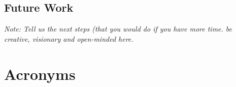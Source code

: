 \documentclass[a4paper,12pt,twoside]{report}
\begin{document}
\section{Future Work}

\textit{Note: Tell us the next steps  (that you would do if you have more time. be creative, visionary and open-minded here.}



\appendix

\chapter{Acronyms}

\begin{acronym}

\end{acronym}


\clearpage

\listoffigures
\clearpage

\listoftables
\clearpage



\end{document}
